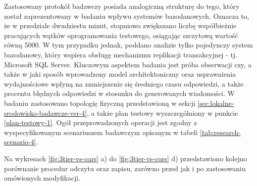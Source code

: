 Zastosowany protokół badawczy posiada analogiczną strukturę do tego, który został zaprezentowany w badaniu wpływu systemów bazodanowych. Oznacza to, że w przedziale dwudziestu minut, stopniowo zwiększano liczbę współbieżnie pracujących wątków oprogramowania testowego, osiągając szczytową wartość równą 5000. W tym przypadku jednak, poddano analizie tylko pojedynczy system bazodanowy, który wspiera obsługę mechanizmu replikacji transakcyjnej - tj. Microsoft SQL Server. Kluczowym aspektem badania jest próba obserwacji czy, a także w jaki sposób wprowadzony model architektoniczny oraz usprawnienia wydajnościowe wpłyną na zmniejszenie się średniego czasu odpowiedzi, a także procentu błędnych odpowiedzi w stosunku do generowanych wiadomości. W badaniu zastosowano topologię fizyczną przedstawioną w sekcji \ref{sec:lokalne-srodowisko-badawcze-ver-4}, a także plan testowy wyszczególniony w punkcie \ref{plan-testowy-1}. Ogół przeprowadzonych operacji jest zgodny z wyspecyfikowanym scenariuszem badawczym opisanym w tabeli \ref{tab:research-scenario-4}.

Na wykresach \ref{fig:3tier-vs-cqrs} a) do \ref{fig:3tier-vs-cqrs} d) przedstawiono kolejno porównanie procedur odczytu oraz zapisu, zarówno przed jak i po zastosowaniu omówionych modyfikacji.

